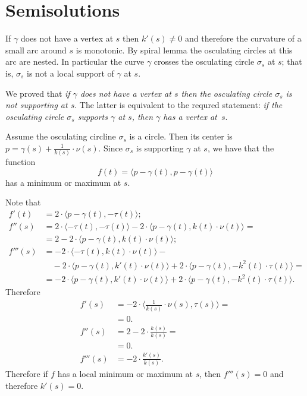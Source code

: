 \chapter{Semisolutions}


If $\gamma$ does not have a vertex at $s$ then $k'(s)\ne 0$ and therefore the curvature of a small arc around $s$ is monotonic.
By spiral lemma the osculating circles at this arc are nested.
In particular the curve $\gamma$ crosses the osculating circle $\sigma_s$ at $s$; 
that is, $\sigma_s$ is not a local support of $\gamma$ at $s$.

We proved that \emph{if $\gamma$ does not have a vertex at $s$ then the osculating circle $\sigma_s$ is not supporting at $s$}.
The latter is equivalent to the requred statement: \emph{if the osculating circle $\sigma_s$ supports $\gamma$ at $s$, then $\gamma$ has a vertex at~$s$}.

Assume the osculating circline $\sigma_s$ is a circle.
Then its center is $p=\gamma(s)+\tfrac1{k(s)}\cdot\nu(s)$.
Since $\sigma_s$ is supporting $\gamma$ at $s$, we have that the function
\[f(t)=\langle p-\gamma(t),p-\gamma(t)\rangle\]
has a minimum or maximum at $s$.

Note that 
\begin{align*}
f'(t)&= 2\cdot\langle p-\gamma(t),-\tau(t)\rangle;
\\
f''(s)&= 
2\cdot\langle -\tau(t),-\tau(t)\rangle
-2\cdot\langle  p-\gamma(t),k(t)\cdot\nu(t)\rangle=
\\
&=2-2\cdot\langle  p-\gamma(t),k(t)\cdot\nu(t)\rangle;
\\
f'''(s)&=-2\cdot\langle  -\tau(t),k(t)\cdot\nu(t)\rangle-
\\&\quad-
2\cdot\langle  p-\gamma(t),k'(t)\cdot\nu(t)\rangle
+2\cdot\langle  p-\gamma(t),-k^2(t)\cdot\tau(t)\rangle=
\\
&=-
2\cdot\langle  p-\gamma(t),k'(t)\cdot\nu(t)\rangle
+2\cdot\langle  p-\gamma(t),-k^2(t)\cdot\tau(t)\rangle.
\end{align*}
Therefore
\begin{align*}
f'(s)&=-2\cdot\langle \tfrac1{k(s)}\cdot\nu(s),\tau(s)\rangle=
\\
&=0.
\\
f''(s)
&=2-2\cdot\tfrac{k(s)}{k(s)}=
\\
&=0.
\\
f'''(s)&=-2\cdot\tfrac{k'(s)}{k(s)}.
\end{align*}
Therefore if $f$ has a local minimum or maximum at $s$, then $f'''(s)=0$ and therefore $k'(s)=0$.

